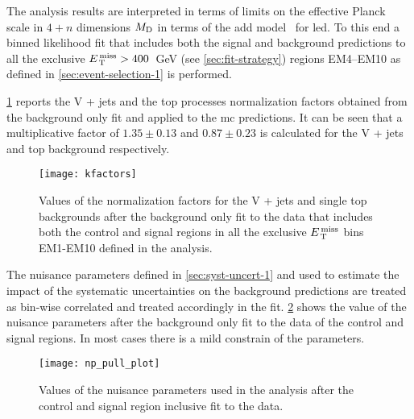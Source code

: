 The analysis results are interpreted in terms of limits on the effective Planck
scale in $4 + n$ dimensions $M_\mathrm{D}$ in terms of the \gls{add}
model~\cite{ADDPaper} for \gls{led}. To this end a binned likelihood fit that
includes both the signal and background predictions to all the exclusive
$E_\mathrm{\, T}^\mathrm{\, miss} > 400$~GeV (see \cref{sec:fit-strategy}) regions EM4--EM10 as defined in
\cref{sec:event-selection-1} is performed.

\cref{fig:kfactors} reports the V + jets and the top processes normalization
factors obtained from the background only fit and applied to the \gls{mc}
predictions. It can be seen that a multiplicative factor of $1.35 \pm 0.13$ and
$0.87 \pm 0.23$ is calculated for the V + jets and top background respectively.
\begin{figure}[!h]
  \centering
  \texttt{[image: kfactors]}
  \caption{Values of the normalization factors for the V + jets and single top
    backgrounds after the background only fit to the data that includes both the
    control and signal regions in all the exclusive $E_\mathrm{\, T}^\mathrm{\, miss}$ bins EM1-EM10 defined
    in the analysis.}
  \label{fig:kfactors}
\end{figure}

The nuisance parameters defined in \cref{sec:syst-uncert-1} and used to estimate
the impact of the systematic uncertainties on the background predictions are
treated as bin-wise correlated and treated accordingly in the
fit. \cref{fig:np_pull} shows the value of the nuisance parameters after the
background only fit to the data of the control and signal regions. In most cases
there is a mild constrain of the parameters.
\begin{figure}[!h]
  \centering
  \texttt{[image: np\_pull\_plot]}
  \caption{Values of the nuisance parameters used in the analysis after the
    control and signal region inclusive fit to the data.}
  \label{fig:np_pull}
\end{figure}

